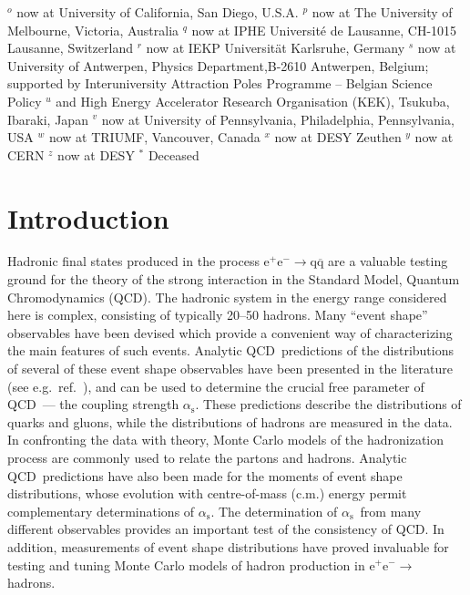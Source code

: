 \documentclass[12pt,a4paper,twoside]{article}
\newcommand{\qqbar}  {\ensuremath{\mathrm{q\overline{q}}}}
\newcommand{\epem}   {\ensuremath{\mathrm{e^+e^-}}}
\newcommand{\as}     {\ensuremath{\alpha_{\mathrm{s}}}}
\newcommand{\qcd}{\mbox{QCD}}
\begin{document}
\newline
$^{  o}$ now at University of California, San Diego, U.S.A.
\newline
$^{  p}$ now at The University of Melbourne, Victoria, Australia
\newline
$^{  q}$ now at IPHE Universit\'e de Lausanne, CH-1015 Lausanne, Switzerland
\newline
$^{  r}$ now at IEKP Universit\"at Karlsruhe, Germany
\newline
$^{  s}$ now at University of Antwerpen, Physics Department,B-2610 Antwerpen,
Belgium; supported by Interuniversity Attraction Poles Programme -- Belgian
Science Policy
\newline
$^{  u}$ and High Energy Accelerator Research Organisation (KEK), Tsukuba,
Ibaraki, Japan
\newline
$^{  v}$ now at University of Pennsylvania, Philadelphia, Pennsylvania, USA
\newline
$^{  w}$ now at TRIUMF, Vancouver, Canada
\newline
$^{  x}$ now at DESY Zeuthen
\newline
$^{  y}$ now at CERN
\newline
$^{  z}$ now at DESY
\newline
$^{  *}$ Deceased
\newpage

%
%
%

\newpage
\section{Introduction}
Hadronic final states produced in the process
$\epem\rightarrow\qqbar$ are a valuable testing ground for the
theory of the strong interaction in the Standard Model,
Quantum Chromodynamics (\qcd).  The hadronic system 
in the energy range considered here
is complex, consisting of typically 20--50 hadrons.
Many ``event shape'' observables have been devised which provide 
a convenient way of characterizing the main features of
such events. Analytic \qcd\ predictions of the distributions
of several of these event shape observables have been presented
in the literature (see e.g.\ ref.~\cite{ESW}), 
and can be used to determine the crucial 
free parameter of \qcd\ --- the coupling strength \as.
These predictions describe the distributions of quarks and gluons, 
while the distributions of hadrons are measured in the data.
In confronting the data with theory, Monte Carlo models of the
hadronization process are commonly used to relate the partons and hadrons.
Analytic \qcd\ predictions have also been made
for the moments of event shape distributions, whose
evolution with centre-of-mass (c.m.) energy permit
complementary determinations of \as. 
The determination of \as\ from many different observables
provides an important test of the consistency of \qcd.
In addition, measurements of event shape distributions
have proved invaluable for testing and tuning
Monte Carlo models of hadron production in $\epem\rightarrow\;$hadrons. 
\end{document}

